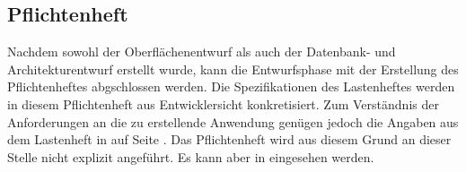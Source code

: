 \subsection{Pflichtenheft}
\label{sec:Pflichtenheft}

Nachdem sowohl der Oberflächenentwurf als auch der Datenbank- und
Architekturentwurf erstellt wurde, kann die Entwurfsphase mit der Erstellung des
Pflichtenheftes abgschlossen werden. Die Spezifikationen des Lastenheftes werden
in diesem Pflichtenheft aus Entwicklersicht konkretisiert. Zum Verständnis der
Anforderungen an die zu erstellende Anwendung genügen jedoch die Angaben aus dem
Lastenheft in  auf Seite \pageref{sec:Lastenheft}. Das
Pflichtenheft wird aus diesem Grund an dieser Stelle nicht explizit angeführt.
Es kann aber in \citet{pflichtenheft2013} eingesehen werden.